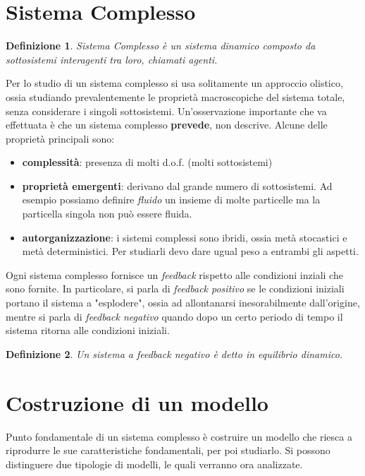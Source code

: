 \documentclass[12pt, a4paper]{book}
\theoremstyle{theorem}
\newtheorem{definition}{Definizione}[section]
\begin{document}
		\section{Sistema Complesso}
		\begin{definition}
			\textit{Sistema Complesso} è un sistema dinamico composto da sottosistemi interagenti tra loro, chiamati agenti.
		\end{definition}
		Per lo studio di un sistema complesso si usa solitamente un approccio olistico, ossia studiando prevalentemente le proprietà macroscopiche del sistema totale, senza considerare i singoli sottosistemi.
		Un'osservazione importante che va effettuata è che un sistema complesso \textbf{prevede}, non descrive.
		Alcune delle proprietà principali sono:
		\begin{itemize}
			\item \textbf{complessità}: presenza di molti d.o.f. (molti sottosistemi)
			\item \textbf{proprietà emergenti}: derivano dal grande numero di sottosistemi. Ad esempio possiamo definire \textit{fluido} un insieme di molte particelle ma la particella singola non può essere fluida.
			\item \textbf{autorganizzazione}: i sistemi complessi sono ibridi, ossia metà stocastici e metà deterministici. Per studiarli devo dare ugual peso a entrambi gli aspetti.
		\end{itemize}
		Ogni sistema complesso fornisce un \emph{feedback} rispetto alle condizioni inziali che sono fornite.
		In particolare, si parla di \emph{feedback positivo} se le condizioni iniziali portano il sistema a "esplodere", ossia ad allontanarsi inesorabilmente dall'origine, mentre si parla di \emph{feedback negativo} quando dopo un certo periodo di tempo il sistema ritorna alle condizioni iniziali.
		\begin{definition}
			Un sistema a feedback negativo è detto in equilibrio dinamico.
		\end{definition}
		
		\section{Costruzione di un modello}
		Punto fondamentale di un sistema complesso è costruire un modello che riesca a riprodurre le sue caratteristiche fondamentali, per poi studiarlo.
		Si possono distinguere due tipologie di modelli, le quali verranno ora analizzate.
\end{document}
